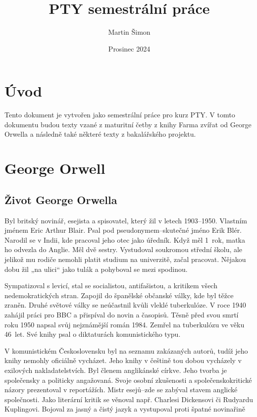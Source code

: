 \documentclass{article}
\title{PTY semestrální práce}
\author{Martin Šimon}
\date{Prosinec 2024}
\begin{document}
\maketitle


\tableofcontents
{} %
\setcounter{page}{2}

\clearpage

\section{Úvod}
Tento dokument je vytvořen jako semestrální práce pro kurz PTY. V tomto dokumentu budou texty vzané z 
maturitní četby z knihy Farma zvířat od George Orwella a následně také některé texty z bakalářského projektu.

\section{George Orwell}

\subsection{Život George Orwella}

Byl britský novinář, esejista a spisovatel, který žil v letech 1903–1950. Vlastním jménem Eric Arthur Blair. Psal pod pseudonymem–skutečné jméno Erik Blér. Narodil se v Indii, kde pracoval jeho otec jako úředník. Když měl 1~rok, matka ho odvezla do Anglie. Měl dvě sestry. Vystudoval soukromou střední školu, ale jelikož mu rodiče nemohli platit studium na univerzitě, začal pracovat. Nějakou dobu žil „na ulici“ jako tulák a pohyboval se mezi spodinou. 

Sympatizoval s levicí, stal se socialistou, antifašistou, a kritikem všech nedemokratických stran. 
Zapojil do španělské občanské války, kde byl těžce zraněn. Druhé světové války se neúčastnil kvůli vleklé 
tuberkulóze. V roce 1940 zahájil práci pro BBC a přispíval do novin a časopisů. Těsně před svou smrtí roku 1950 
napsal svůj nejznámější román 1984. Zemřel na tuberkulózu ve věku 46~let. Své knihy psal o diktaturách 
komunistického typu. 

V komunistickém Československu byl na seznamu zakázaných autorů, tudíž jeho knihy nemohly oficiálně vycházet. 
Jeho knihy v češtině tou dobou vycházely v exilových nakladatelstvích. Byl členem anglikánské církve. Jeho 
tvorba je společensky a politicky angažovaná. Svoje osobní zkušenosti a společenskokritické názory prezentoval 
v reportážích. Mistr esejů–zde se zabýval stavem anglické společnosti. Jako literární kritik se věnoval 
např. Charlesi Dickensovi či Rudyardu Kuplingovi. Bojoval za jasný a čistý jazyk a vystupoval proti špatné 
novinařině
\end{document}
